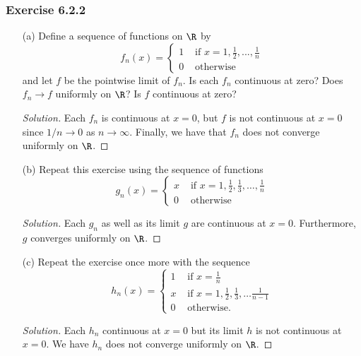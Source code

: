 \subsubsection{Exercise 6.2.2} 
\begin{enumerate}
    \item[(a)] Define a sequence of functions on \( \R  \) by 
        \[  f_n(x) = 
        \begin{cases}
            1 &\text{~if~} x = 1, \frac{ 1 }{ 2 }, ..., \frac{ 1 }{ n } \\ 
            0 &\text{~otherwise} 
        \end{cases} \]
and let \( f  \) be the pointwise limit of \( f_n \). Is each \( f_n  \) continuous at zero? Does \( f_n \to f  \) uniformly on \( \R  \)? Is \( f  \) continuous at zero? 
\begin{proof}[Solution]
Each \( f_n  \) is continuous at \( x = 0  \), but \( f  \) is not continuous at \( x = 0  \) since \( 1/ n \to 0  \) as \( n \to \infty  \). Finally, we have that \( f_n  \) does not converge uniformly on \( \R  \).
\end{proof}

\item[(b)] Repeat this exercise using the sequence of functions
    \[  g_n(x) = 
    \begin{cases}
        x &\text{~if~} x = 1, \frac{ 1 }{ 2 }, \frac{ 1 }{ 3 }, \dots, \frac{ 1 }{ n } \\
        0 &\text{~otherwise}
    \end{cases} \]
    \begin{proof}[Solution]
    Each \( g_n  \) as well as its limit \( g  \) are continuous at \( x = 0  \). Furthermore, \( g  \) converges uniformly on \( \R  \).
    \end{proof}
\item[(c)] Repeat the exercise once more with the sequence
    \[  h_n(x) = 
    \begin{cases}
        1 &\text{~if~} x = \frac{ 1 }{ n } \\
        x &\text{~if~} x = 1, \frac{ 1 }{ 2 }, \frac{ 1 }{ 3 }, \dots \frac{ 1 }{ n-1  } \\
        0 &\text{~otherwise}.
    \end{cases} \]
    \begin{proof}[Solution]
    Each \( h_n  \) continuous at \( x = 0  \) but its limit \( h  \) is not continuous at \( x = 0  \). We have \( h_n   \) does not converge uniformly on \( \R  \).
    \end{proof} 
\end{enumerate}

